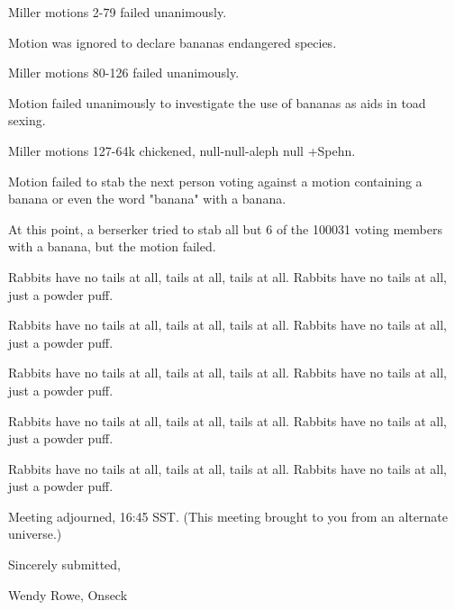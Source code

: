 \documentclass[12pt]{article}
\begin{document}
Miller motions 2-79 failed unanimously.

Motion was ignored to declare bananas endangered species.

Miller motions 80-126 failed unanimously.

Motion failed unanimously to investigate the use of bananas as aids in toad sexing.

Miller motions 127-64k chickened, null-null-aleph null +Spehn.

Motion failed to stab the next person voting against a motion containing a banana or even the word "banana" with a banana.

At this point, a berserker tried to stab all but 6 of the 100031 voting members with a banana, but the motion failed.

Rabbits have no tails at all, tails at all, tails at all. Rabbits have no tails at all, just a powder puff.

Rabbits have no tails at all, tails at all, tails at all. Rabbits have no tails at all, just a powder puff.

Rabbits have no tails at all, tails at all, tails at all. Rabbits have no tails at all, just a powder puff.

Rabbits have no tails at all, tails at all, tails at all. Rabbits have no tails at all, just a powder puff.

Rabbits have no tails at all, tails at all, tails at all. Rabbits have no tails at all, just a powder puff.

\vspace{12pt}

\noindent
Meeting adjourned, 16:45 SST. (This meeting brought to you from an alternate universe.)

\vspace{18pt}

\centerline{Sincerely submitted,}
\centerline{Wendy Rowe, Onseck}
\end{document}
